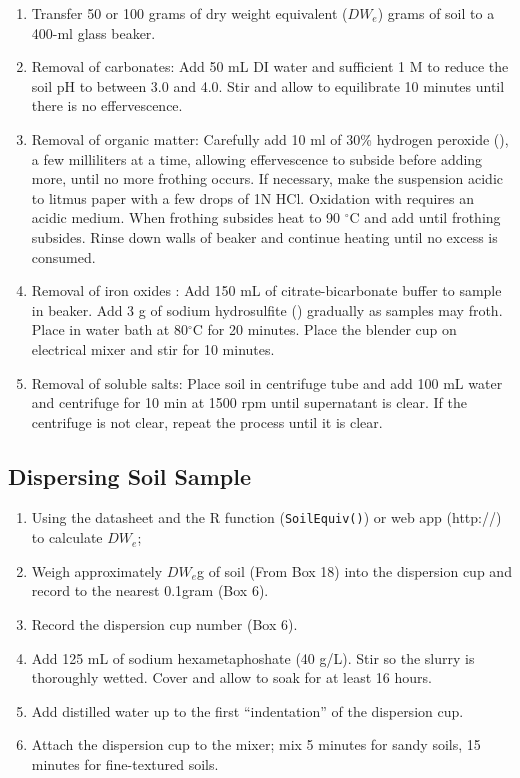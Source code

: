 \documentclass{tufte-handout}
\begin{document}
\begin{enumerate}
	\item Transfer 50 or 100 grams of dry weight equivalent ($DW_e$) grams of soil to a 400-ml glass beaker.
	
	\item Removal of carbonates: Add 50 mL DI water and sufficient 1 M  to reduce the soil pH to between 3.0 and 4.0. Stir and allow to equilibrate 10 minutes until there is no effervescence.

	\item Removal of organic matter: Carefully add 10 ml of 30\% hydrogen peroxide (), a few milliliters at a time, allowing effervescence to subside before adding more, until no more frothing occurs. If necessary, make the suspension acidic to litmus paper with a few drops of 1N HCl.  Oxidation with  requires an acidic medium. When frothing subsides heat to 90 $^\circ$C and add  until frothing subsides. Rinse down walls of beaker and continue heating until no excess  is consumed.

	\item Removal of iron oxides \citep[pp. 574-576]{kunze1986pretreatment}: Add 150 mL of citrate-bicarbonate buffer to sample in beaker. Add 3 g of sodium hydrosulfite () gradually as samples may froth.  Place in water bath at 80$^\circ$C for 20 minutes.  Place the blender cup on electrical mixer and stir for 10 minutes.

	\item Removal of soluble salts: Place soil in centrifuge tube and add 100 mL water and centrifuge for 10 min at 1500 rpm until supernatant is clear.  If the centrifuge is not clear, repeat the process until it is clear.

\end{enumerate}
 
\subsection{Dispersing Soil Sample}

\begin{enumerate}
	\item Using the datasheet and the R function (\texttt{SoilEquiv()}) or web app (http://) to calculate $DW_e$;
	\item Weigh approximately $DW_e$g of soil (From Box 18) into the dispersion cup and record to the nearest 0.1gram (Box 6). 
	\item Record the dispersion cup number (Box 6).
	\item Add 125 mL of sodium hexametaphoshate (40 g/L). Stir so the slurry is thoroughly wetted. Cover and allow to soak for at least 16 hours. 
	\item Add distilled water up to the first ``indentation'' of the dispersion cup.
	\item Attach the dispersion cup to the mixer; mix 5 minutes for sandy soils, 15 minutes for fine-textured soils.
	
\end{enumerate}
\end{document}
